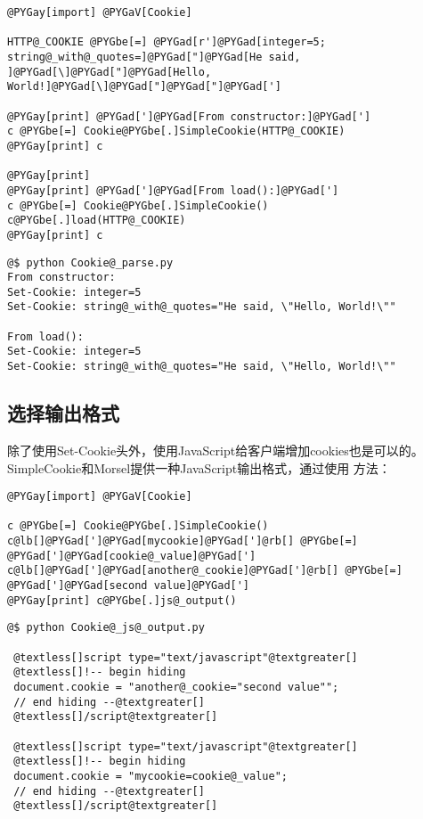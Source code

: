 \documentclass[a4paper,10pt,english]{manual}
\begin{document}
\begin{Verbatim}[commandchars=@\[\]]
@PYGay[import] @PYGaV[Cookie]

HTTP@_COOKIE @PYGbe[=] @PYGad[r']@PYGad[integer=5; string@_with@_quotes=]@PYGad["]@PYGad[He said, ]@PYGad[\]@PYGad["]@PYGad[Hello, World!]@PYGad[\]@PYGad["]@PYGad["]@PYGad[']

@PYGay[print] @PYGad[']@PYGad[From constructor:]@PYGad[']
c @PYGbe[=] Cookie@PYGbe[.]SimpleCookie(HTTP@_COOKIE)
@PYGay[print] c

@PYGay[print]
@PYGay[print] @PYGad[']@PYGad[From load():]@PYGad[']
c @PYGbe[=] Cookie@PYGbe[.]SimpleCookie()
c@PYGbe[.]load(HTTP@_COOKIE)
@PYGay[print] c
\end{Verbatim}

\begin{Verbatim}[commandchars=@\[\]]
@$ python Cookie@_parse.py
From constructor:
Set-Cookie: integer=5
Set-Cookie: string@_with@_quotes="He said, \"Hello, World!\""

From load():
Set-Cookie: integer=5
Set-Cookie: string@_with@_quotes="He said, \"Hello, World!\""
\end{Verbatim}


\subsection{选择输出格式}

除了使用Set-Cookie头外，使用JavaScript给客户端增加cookies也是可以的。SimpleCookie和Morsel提供一种JavaScript输出格式，通过使用  方法：

\begin{Verbatim}[commandchars=@\[\]]
@PYGay[import] @PYGaV[Cookie]

c @PYGbe[=] Cookie@PYGbe[.]SimpleCookie()
c@lb[]@PYGad[']@PYGad[mycookie]@PYGad[']@rb[] @PYGbe[=] @PYGad[']@PYGad[cookie@_value]@PYGad[']
c@lb[]@PYGad[']@PYGad[another@_cookie]@PYGad[']@rb[] @PYGbe[=] @PYGad[']@PYGad[second value]@PYGad[']
@PYGay[print] c@PYGbe[.]js@_output()
\end{Verbatim}

\begin{Verbatim}[commandchars=@\[\]]
@$ python Cookie@_js@_output.py

 @textless[]script type="text/javascript"@textgreater[]
 @textless[]!-- begin hiding
 document.cookie = "another@_cookie="second value"";
 // end hiding --@textgreater[]
 @textless[]/script@textgreater[]

 @textless[]script type="text/javascript"@textgreater[]
 @textless[]!-- begin hiding
 document.cookie = "mycookie=cookie@_value";
 // end hiding --@textgreater[]
 @textless[]/script@textgreater[]
\end{Verbatim}
\end{document}
